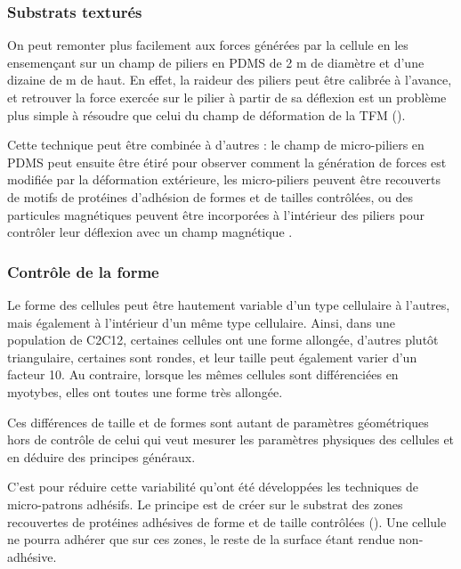 \subsubsection{Substrats texturés}

On peut remonter plus facilement aux forces générées par la cellule en les ensemençant sur un champ de piliers en PDMS de 2 \micro m de diamètre et d'une dizaine de \micro m de haut. 
En effet, la raideur des piliers peut être calibrée à l'avance, et retrouver la force exercée sur le pilier à partir de sa déflexion est un problème plus simple à résoudre que celui du champ de déformation de la TFM (\cite{du_roure_force_2005}). 

Cette technique peut être combinée à d'autres : le champ de micro-piliers en PDMS peut ensuite être étiré pour observer comment la génération de forces est modifiée par la déformation extérieure, les micro-piliers peuvent être recouverts de motifs de protéines d'adhésion de formes et de tailles contrôlées, ou des particules magnétiques peuvent être incorporées à l'intérieur des piliers pour contrôler leur déflexion avec un champ magnétique \parencite{gupta_micropillar_2015}. 

\subsubsection{Contrôle de la forme}

Le forme des cellules peut être hautement variable d'un type cellulaire à l'autres, mais également à l'intérieur d'un même type cellulaire. 
Ainsi, dans une population de C2C12, certaines cellules ont une forme allongée, d'autres plutôt triangulaire, certaines sont rondes, et leur taille peut également varier d'un facteur 10. Au contraire, lorsque les mêmes cellules sont différenciées en myotybes, elles ont toutes une forme très allongée. 

Ces différences de taille et de formes sont autant de paramètres géométriques hors de contrôle de celui qui veut mesurer les paramètres physiques des cellules et en déduire des principes généraux. 

C'est pour réduire cette variabilité qu'ont été développées les techniques de micro-patrons adhésifs. 
Le principe est de créer sur le substrat des zones recouvertes de protéines adhésives de forme et de taille contrôlées (\cite{thery_adhesive_2009}).
Une cellule ne pourra adhérer que sur ces zones, le reste de la surface étant rendue non-adhésive. 

